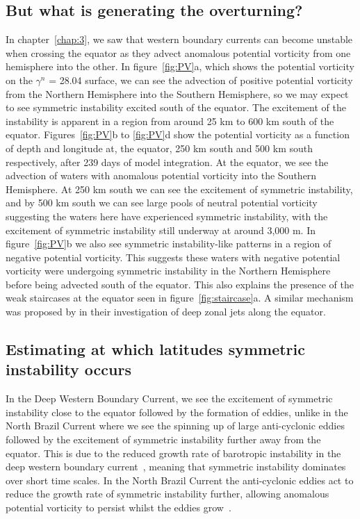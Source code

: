 \subsection{But what is generating the overturning?}
In chapter~\ref{chap:3}, we saw that western boundary currents can become unstable when crossing the equator as they advect anomalous potential vorticity from one hemisphere into the other. In figure~\ref{fig:PV}a, which shows the potential vorticity on the $\gamma^n$ = 28.04 surface, we can see the advection of positive potential vorticity from the Northern Hemisphere into the Southern Hemisphere, so we may expect to see symmetric instability excited south of the equator. The excitement of the instability is apparent in a region from around 25 km to 600 km south of the equator. Figures~\ref{fig:PV}b to \ref{fig:PV}d show the potential vorticity as a function of depth and longitude at, the equator, 250 km south and 500 km south respectively, after 239 days of model integration. At the equator, we see the advection of waters with anomalous potential vorticity into the Southern Hemisphere. At 250 km south we can see the excitement of symmetric instability, and by 500 km south we can see large pools of neutral potential vorticity suggesting the waters here have experienced symmetric instability, with the excitement of symmetric instability still underway at around 3,000 m. In figure~\ref{fig:PV}b we also see symmetric instability-like patterns in a region of negative potential vorticity. This suggests these waters with negative potential vorticity were undergoing symmetric instability in the Northern Hemisphere before being advected south of the equator. This also explains the presence of the weak staircases at the equator seen in figure~\ref{fig:staircase}a. A similar mechanism was proposed by \citet{DOrgeville2004} in their investigation of deep zonal jets along the equator.

\subsection{Estimating at which latitudes symmetric instability occurs}
\label{sec:relation2nbc}
In the Deep Western Boundary Current, we see the excitement of symmetric instability close to the equator followed by the formation of eddies, unlike in the North Brazil Current where we see the spinning up of large anti-cyclonic eddies followed by the excitement of symmetric instability further away from the equator. This is due to the reduced growth rate of barotropic instability in the deep western boundary current~\citep{Edwards1998II}, meaning that symmetric instability dominates over short time scales. In the North Brazil Current the anti-cyclonic eddies act to reduce the growth rate of symmetric instability further, allowing anomalous potential vorticity to persist whilst the eddies grow~\citep{Buckingham2021}. 


